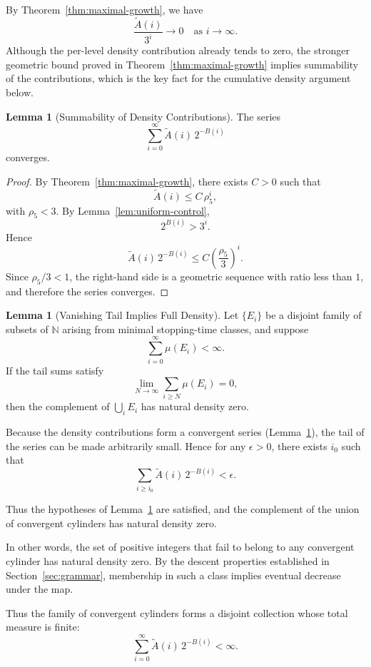 \documentclass[12pt, oneside]{article}   	%
\numberwithin{equation}{section}          %
\theoremstyle{definition}
\newtheorem{lemma}[theorem]{Lemma}
\begin{document}
By Theorem~\ref{thm:maximal-growth}, we have
\[
\frac{\widetilde A(i)}{3^i} \longrightarrow 0 \quad \text{as } i\to\infty.
\]
Although the per-level density contribution already tends to zero,
the stronger geometric bound proved in Theorem~\ref{thm:maximal-growth}
implies summability of the contributions, which is the key fact for the
cumulative density argument below.

\begin{lemma}[Summability of Density Contributions]
\label{lem:summable-density}
The series
\[
\sum_{i=0}^{\infty} \widetilde A(i)\,2^{-B(i)}
\]
converges.
\end{lemma}

\begin{proof}
By Theorem~\ref{thm:maximal-growth}, there exists $C>0$ such that
\[
\widetilde A(i) \le C\,\rho_5^i,
\]
with $\rho_5<3$.  By Lemma~\ref{lem:uniform-control},
\[
2^{B(i)} > 3^i.
\]
Hence
\[
\widetilde A(i)\,2^{-B(i)}
\le
C\left(\frac{\rho_5}{3}\right)^i.
\]
Since $\rho_5/3<1$, the right-hand side is a geometric sequence with ratio
less than $1$, and therefore the series converges.
\end{proof}

\begin{lemma}[Vanishing Tail Implies Full Density]
\label{lem:full-density}
Let $\{E_i\}$ be a disjoint family of subsets of $\mathbb{N}$
arising from minimal stopping-time classes, and suppose
\[
\sum_{i=0}^\infty \mu(E_i) < \infty.
\]
If the tail sums satisfy
\[
\lim_{N\to\infty} \sum_{i\ge N} \mu(E_i) = 0,
\]
then the complement of $\bigcup_i E_i$ has natural density zero.
\end{lemma}

Because the density contributions form a convergent series
(Lemma~\ref{lem:summable-density}), the tail of the series can be made
arbitrarily small. Hence for any $\epsilon>0$, there exists $i_0$ such that
\[
\sum_{i \ge i_0} \widetilde A(i)\,2^{-B(i)} < \epsilon.
\]

Thus the hypotheses of Lemma~\ref{lem:full-density} are satisfied, and the complement
of the union of convergent cylinders has natural density zero.

In other words, the set of positive integers that fail to belong to any convergent cylinder
has natural density zero. By the descent properties established in Section~\ref{sec:grammar},
membership in such a class implies eventual decrease under the map.

Thus the family of convergent cylinders forms a disjoint collection whose
total measure is finite:
\[
\sum_{i=0}^{\infty} \widetilde A(i)\,2^{-B(i)} < \infty.
\]
\end{document}
